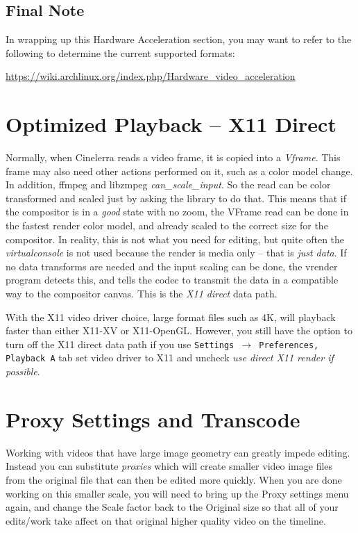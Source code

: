 \subsection{Final Note}%
\label{sub:final_note_on_acceleration}

In wrapping up this Hardware Acceleration section, you may want to refer to the following to determine the current supported formats:

{\small \url{https://wiki.archlinux.org/index.php/Hardware_video_acceleration}}

\section{Optimized Playback -- X11 Direct}%
\label{sec:optimized_playback}

Normally, when Cinelerra reads a video frame, it is copied into a \textit{Vframe}.  This frame may also need other actions performed on it, such as a color model change.  In addition, ffmpeg and libzmpeg \textit{can\_scale\_input}.  So the read can be color transformed and scaled just by asking the library to do that.  This means that if the compositor is in a \textit{good} state with no zoom, the VFrame read can be done in the fastest render color model, and already scaled to the correct size for the compositor.  In reality, this is not what you need for editing, but quite often the \textit{virtualconsole} is not used because the render is media only -- that is \textit{just data}.  If no data transforms are needed and the input scaling can be done, the vrender program detects this, and tells the codec to transmit the data in a compatible way to the compositor canvas. This is the \textit{X11 direct} data path.

With the X11 video driver choice, large format files such as 4K, will playback faster than either X11-XV or X11-OpenGL.  However, you still have the option to turn off the X11 direct data path if you use
\texttt{Settings $\rightarrow$ Preferences, Playback A} tab set video driver to X11 and uncheck \textit{use direct X11 render if possible}.


\section{Proxy Settings and Transcode}%
\label{sec:proxy_settings}

Working with videos that have large image geometry can greatly impede editing.  Instead you can substitute \textit{proxies} which will create smaller video image files from the original file that can then be edited more quickly.   When you are done working on this smaller scale, you will need to bring up the Proxy settings menu again, and change the Scale factor back to the Original size so that all of your edits/work take affect on that original higher quality video on the timeline.  


